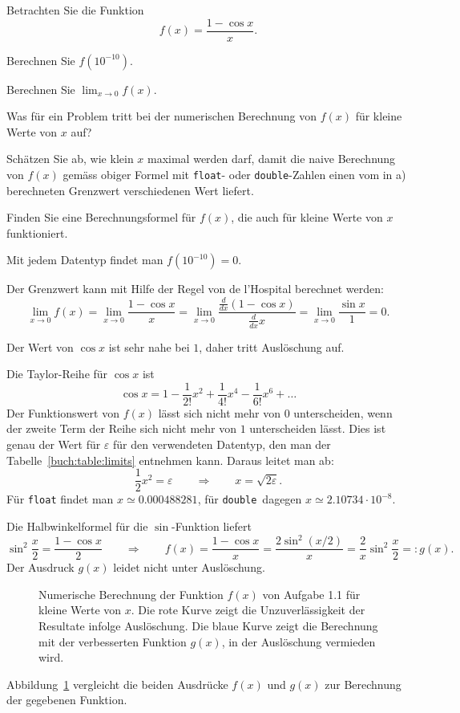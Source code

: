 Betrachten Sie die Funktion
\[
f(x) = \frac{1-\cos x}{x}.
\]
\begin{teilaufgaben}
\item Berechnen Sie $f(10^{-10})$.
\item Berechnen Sie $\displaystyle \lim_{x\to 0} f(x)$.
\item Was für ein Problem tritt bei der numerischen Berechnung von
$f(x)$ für kleine Werte von $x$ auf?
\item Schätzen Sie ab, wie klein  $x$ maximal werden darf, damit
die naive Berechnung von $f(x)$ gemäss obiger Formel mit
\texttt{float}- oder \texttt{double}-Zahlen einen vom in a) berechneten
Grenzwert verschiedenen Wert liefert.
\item Finden Sie eine Berechnungsformel für $f(x)$, die auch für kleine
Werte von $x$ funktioniert.
\end{teilaufgaben}

\begin{loesung}
\begin{teilaufgaben}
\item
Mit jedem Datentyp findet man $f(10^{-10})=0$.
\item
Der Grenzwert kann mit Hilfe der Regel von de l'Hospital berechnet werden:
\[
\lim_{x\to 0}f(x)
=
\lim_{x\to 0}\frac{1-\cos x}{x}
=
\lim_{x\to 0}\frac{\frac{d}{dx}(1-\cos x)}{\frac{d}{dx} x}
=
\lim_{x\to 0} \frac{\sin x}{1} = 0.
\]
\item
Der Wert von $\cos x$ ist sehr nahe bei $1$, daher tritt Auslöschung auf.
\item
Die Taylor-Reihe für $\cos x$ ist
\[
\cos x = 1 -\frac1{2!}x^2 + \frac{1}{4!}x^4 - \frac{1}{6!}x^6 +\dots
\]
Der Funktionswert von $f(x)$ lässt sich nicht mehr von $0$ unterscheiden,
wenn der zweite Term der Reihe sich nicht mehr von $1$ unterscheiden lässt.
Dies ist genau der Wert für $\varepsilon$ für den verwendeten Datentyp,
den man der Tabelle~\ref{buch:table:limits} entnehmen kann.
Daraus leitet man ab:
\[
\frac12x^2 = \varepsilon
\qquad\Rightarrow\qquad
x=\sqrt{2\varepsilon}.
\]
Für \texttt{float} findet man $x\simeq 0.000488281$,
für \texttt{double} dagegen $x\simeq 2.10734\cdot 10^{-8}$.
\item
Die Halbwinkelformel für die $\sin$-Funktion liefert
\[
\sin^2 \frac{x}2
=
\frac{1-\cos x}{2}
\qquad\Rightarrow\qquad
f(x)
=
\frac{1-\cos x}{x}
=
\frac{2\sin^2(x/2)}{x}
=
\frac{2}{x}\sin^2\frac{x}{2}
=:
g(x).
\]
Der Ausdruck $g(x)$ leidet nicht unter Auslöschung.
\qedhere
\end{teilaufgaben}
\begin{figure}
\centering
{}
\caption{Numerische Berechnung der Funktion $f(x)$ von Aufgabe 1.1 für
kleine Werte von $x$.
Die rote Kurve zeigt die Unzuverlässigkeit der Resultate infolge
Auslöschung.
Die blaue Kurve zeigt die Berechnung mit der verbesserten Funktion
$g(x)$, in der Auslöschung vermieden wird.
\label{buch:figure:1001}}
\end{figure}
Abbildung~\ref{buch:figure:1001} vergleicht die beiden Ausdrücke
$f(x)$ und $g(x)$ zur Berechnung der gegebenen Funktion.
\end{loesung}


